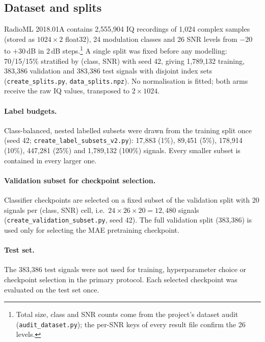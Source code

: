 \documentclass[11pt,a4paper]{article}
\begin{document}
\subsection{Dataset and splits}
RadioML 2018.01A contains 2,555,904 IQ recordings of 1,024 complex samples (stored as $1024\times2$ float32), 24 modulation classes and 26 SNR levels from $-20$ to $+30$\,dB in 2\,dB steps.\footnote{Total size, class and SNR counts come from the project's dataset audit (\texttt{audit\_dataset.py}); the per-SNR keys of every result file confirm the 26 levels.}
A single split was fixed before any modelling: 70/15/15\% stratified by (class, SNR) with seed 42, giving 1,789,132 training, 383,386 validation and 383,386 test signals with disjoint index sets (\texttt{create\_splits.py}, \texttt{data\_splits.npz}).
No normalisation is fitted; both arms receive the raw IQ values, transposed to $2\times1024$.

\paragraph{Label budgets.} Class-balanced, nested labelled subsets were drawn from the training split once (seed 42; \texttt{create\_label\_subsets\_v2.py}): 17,883 (1\%), 89,451 (5\%), 178,914 (10\%), 447,281 (25\%) and 1,789,132 (100\%) signals. Every smaller subset is contained in every larger one.

\paragraph{Validation subset for checkpoint selection.} Classifier checkpoints are selected on a fixed subset of the validation split with 20 signals per (class, SNR) cell, i.e.\ $24\times26\times20 = 12{,}480$ signals (\texttt{create\_validation\_subset.py}, seed 42). The full validation split (383,386) is used only for selecting the MAE pretraining checkpoint.

\paragraph{Test set.} The 383,386 test signals were not used for training, hyperparameter choice or checkpoint selection in the primary protocol. Each selected checkpoint was evaluated on the test set once.
\end{document}
